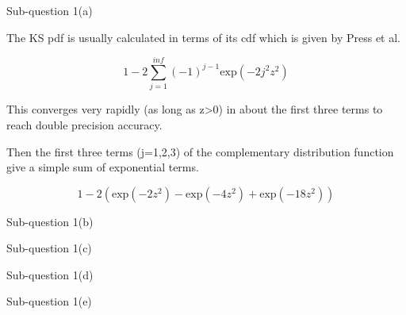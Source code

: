 
\begin{subsection}{Sub-question 1(a)}
  


The KS pdf is usually calculated in terms of its cdf which is given by Press et al.

\begin{equation}
  1-2\sum_{j=1}^{inf}(-1)^{j-1}\text{exp}(-2j^2z^2)
\end{equation}

This converges very rapidly (as long as z>0) in about the first three terms to reach double precision accuracy.

Then the first three terms (j=1,2,3) of the complementary distribution function give a simple sum of exponential terms.

\begin{equation}
  1-2\left( \text{exp}(-2z^2) - \text{exp}(-4z^2) + \text{exp}(-18z^2)\right)
\end{equation}

\end{subsection}



\begin{subsection}{Sub-question 1(b)}
  



\end{subsection}



\begin{subsection}{Sub-question 1(c)}
  



\end{subsection}



\begin{subsection}{Sub-question 1(d)}
  



\end{subsection}


\begin{subsection}{Sub-question 1(e)}
  



\end{subsection}
